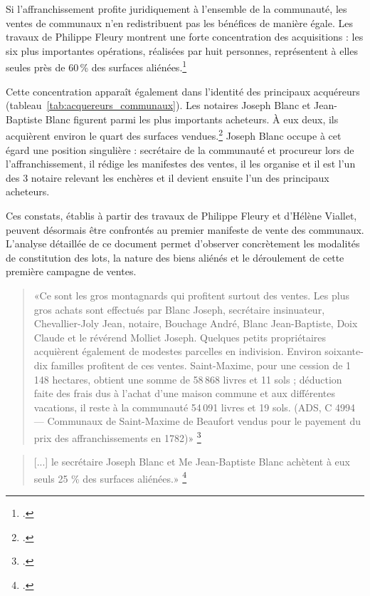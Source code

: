 \documentclass[12pt,a4paper]{report}
\begin{document}
Si l'affranchissement profite juridiquement à l'ensemble de la communauté, les ventes de communaux n'en redistribuent pas les bénéfices de manière égale. Les travaux de Philippe Fleury montrent une forte concentration des acquisitions : les six plus importantes opérations, réalisées par huit personnes, représentent à elles seules près de 60\,\% des surfaces aliénées.\footcite[79]{HViallet1993}

Cette concentration apparaît également dans l'identité des principaux acquéreurs (tableau~\ref{tab:acquereurs_communaux}). Les notaires Joseph Blanc et Jean-Baptiste Blanc figurent parmi les plus importants acheteurs. À eux deux, ils acquièrent environ le quart des surfaces vendues.\footcite[79]{HViallet1993} Joseph Blanc occupe à cet égard une position singulière : secrétaire de la communauté et procureur lors de l'affranchissement, il rédige les manifestes des ventes, il les organise et il est l'un des 3 notaire relevant les enchères et il devient ensuite l'un des principaux acheteurs.

Ces constats, établis à partir des travaux de Philippe Fleury et d'Hélène Viallet, peuvent désormais être confrontés au premier manifeste de vente des communaux. L'analyse détaillée de ce document permet d'observer concrètement les modalités de constitution des lots, la nature des biens aliénés et le déroulement de cette première campagne de ventes.



\begin{quote}
	«Ce sont les gros montagnards qui profitent surtout des ventes. Les plus gros achats sont effectués par Blanc Joseph, secrétaire insinuateur, Chevallier-Joly Jean, notaire, Bouchage André, Blanc Jean-Baptiste, Doix Claude et le révérend Molliet Joseph. Quelques petits propriétaires acquièrent également de modestes parcelles en indivision. Environ soixante-dix familles profitent de ces ventes. Saint-Maxime, pour une cession de 1\,148 hectares, obtient une somme de 58\,868 livres et 11 sols ; déduction faite des frais dus à l’achat d’une maison commune et aux différentes vacations, il reste à la communauté 54\,091 livres et 19 sols. (ADS, C 4994 — Communaux de Saint-Maxime de Beaufort vendus pour le payement du prix des affranchissements en 1782)»
	\footcite[127]{BordeVibertGuigue1971VieRuraleBeaufort}
\end{quote}



\begin{quote}
	[...] le secrétaire Joseph Blanc et Me Jean-Baptiste Blanc achètent à eux seuls 25 \% des surfaces aliénées.»
	\footcite[79]{HViallet1993}
\end{quote}
\end{document}
